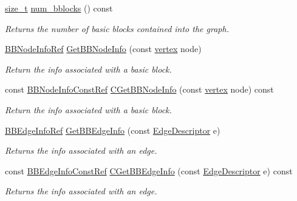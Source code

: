 \begin{DoxyCompactItemize}
\hyperlink{tutorial__fpt__2017_2intro_2sixth_2test_8c_a7c94ea6f8948649f8d181ae55911eeaf}{size\+\_\+t} \hyperlink{structBBGraph_aa2587565b22cca94135ee697daa21922}{num\+\_\+bblocks} () const
\begin{DoxyCompactList}\small\item\em Returns the number of basic blocks contained into the graph. \end{DoxyCompactList}\item 
\hyperlink{basic__block_8hpp_a3e08f6abf5bad7d4434f60438049fcf9}{B\+B\+Node\+Info\+Ref} \hyperlink{structBBGraph_aab31f928508260163e2e5cd30083e49f}{Get\+B\+B\+Node\+Info} (const \hyperlink{graph_8hpp_abefdcf0544e601805af44eca032cca14}{vertex} node)
\begin{DoxyCompactList}\small\item\em Return the info associated with a basic block. \end{DoxyCompactList}\item 
const \hyperlink{basic__block_8hpp_a72638f01c84faeea976a7a0cc2484a5d}{B\+B\+Node\+Info\+Const\+Ref} \hyperlink{structBBGraph_ae12816f321950e50a70e772fd171f52e}{C\+Get\+B\+B\+Node\+Info} (const \hyperlink{graph_8hpp_abefdcf0544e601805af44eca032cca14}{vertex} node) const
\begin{DoxyCompactList}\small\item\em Return the info associated with a basic block. \end{DoxyCompactList}\item 
\hyperlink{basic__block_8hpp_a2d5b9344939ba07dd3288e6c16079ef3}{B\+B\+Edge\+Info\+Ref} \hyperlink{structBBGraph_a59fd37fa481d216fc19b00e369496ee4}{Get\+B\+B\+Edge\+Info} (const \hyperlink{graph_8hpp_a9eb9afea34e09f484b21f2efd263dd48}{Edge\+Descriptor} e)
\begin{DoxyCompactList}\small\item\em Returns the info associated with an edge. \end{DoxyCompactList}\item 
const \hyperlink{basic__block_8hpp_adfb5e3720b7f09fc43816c9ef954dbb5}{B\+B\+Edge\+Info\+Const\+Ref} \hyperlink{structBBGraph_a2edc519b9c5146df541132a2479e94e3}{C\+Get\+B\+B\+Edge\+Info} (const \hyperlink{graph_8hpp_a9eb9afea34e09f484b21f2efd263dd48}{Edge\+Descriptor} e) const
\begin{DoxyCompactList}\small\item\em Returns the info associated with an edge. \end{DoxyCompactList}\item 

\end{DoxyCompactItemize}
